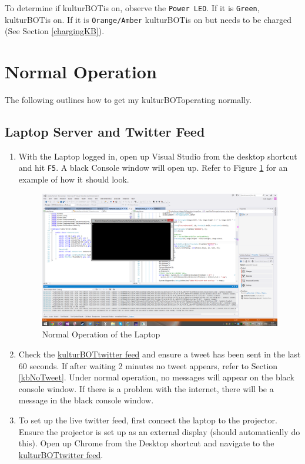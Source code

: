 \documentclass[]{article}
\newcommand{\kb}{kulturBOT}
\newcommand{\kbspace}{\kb \space}
\newcommand{\mykb}{my \kb}
\newcommand{\mykbspace}{\mykb \space}
\begin{document}
To determine if \kbspace is on, observe the \texttt{Power LED}. If it is \texttt{Green}, \kbspace is on. If it is \texttt{Orange/Amber} \kbspace is on but needs to be charged (See Section \ref{chargingKB}).

\section{Normal Operation}
The following outlines how to get \mykbspace operating normally.

\subsection{Laptop Server and Twitter Feed}
\begin{enumerate}
	\item With the Laptop logged in, open up Visual Studio from the desktop shortcut and hit \texttt{F5}. A black Console window will open up. Refer to Figure \ref{normalVS} for an example of how it should look.
	
	\begin{figure}[h!]
		\centering
	    \includegraphics[width=1\textwidth]{img/normalVSlook.png}
	    \caption{Normal Operation of the Laptop}
	    \label{normalVS}
	\end{figure}
	
	\item Check the \href{https://twitter.com/kulturBOT}{\kbspace twitter feed} and ensure a tweet has been sent in the last 60 seconds. If after waiting 2 minutes no tweet appears, refer to Section \ref{kbNoTweet}. Under normal operation, no messages will appear on the black console window. If there is a problem with the internet, there will be a message in the black console window.
	
	\item To set up the live twitter feed, first connect the laptop to the projector. Ensure the projector is set up as an external display (should automatically do this). Open up Chrome from the Desktop shortcut and navigate to the \href{https://twitter.com/kulturBOT}{\kbspace twitter feed}.
	

\end{enumerate}
\end{document}
